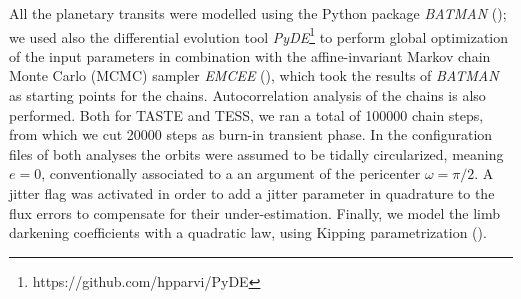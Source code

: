\documentclass{aa}
\begin{document}
All the planetary transits were modelled using the Python package 
\textit{BATMAN} (\cite{Kreidberg}); we used also the differential 
evolution tool \textit{PyDE}\footnote{https://github.com/hpparvi/PyDE} 
to perform global optimization of the input parameters in combination with the affine-invariant Markov chain Monte Carlo (MCMC) sampler \textit{EMCEE} (\cite{Foreman}), which took the results of \textit{BATMAN} as starting points for the chains.  Autocorrelation analysis of the chains is also performed. Both for TASTE and TESS, we ran a total of 100000 chain steps, 
from which we cut 20000 steps as burn-in transient phase.
In the configuration files of both analyses the orbits were assumed to be tidally circularized, meaning $e=0$, conventionally associated to a an argument of the pericenter $\omega=\pi/2$. A jitter flag was activated in order to add a jitter parameter in quadrature to the flux errors to compensate for their under-estimation. Finally, we model the limb darkening coefficients with a quadratic law, using Kipping parametrization (\cite{Kipping}).
\end{document}
